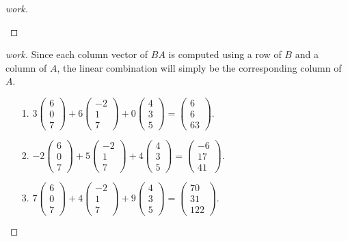 \documentclass{article}
\begin{document}
\begin{question}{1.3}{}
{\begin{enumerate}
\begin{proof}[work]
\begin{enumerate}
        \end{enumerate}
      \end{proof}
      \begin{proof}[work] Since each column vector of $BA$ is computed using a row of $B$ and a column of $A$, the linear combination will simply be the corresponding column of $A$.
        \begin{enumerate}
          \item[1.] $3\begin{pmatrix}6 \\ 0 \\ 7\end{pmatrix} + 6\begin{pmatrix}-2 \\ 1 \\ 7\end{pmatrix} + 0\begin{pmatrix}4 \\ 3 \\ 5\end{pmatrix} = \begin{pmatrix}6 \\ 6 \\ 63\end{pmatrix}$.
          \item[2.] $-2\begin{pmatrix}6 \\ 0 \\ 7\end{pmatrix} + 5\begin{pmatrix}-2 \\ 1 \\ 7\end{pmatrix} + 4\begin{pmatrix}4 \\ 3 \\ 5\end{pmatrix} = \begin{pmatrix}-6 \\ 17 \\ 41\end{pmatrix}$.
          \item[3.] $7\begin{pmatrix}6 \\ 0 \\ 7\end{pmatrix} + 4\begin{pmatrix}-2 \\ 1 \\ 7\end{pmatrix} + 9\begin{pmatrix}4 \\ 3 \\ 5\end{pmatrix} = \begin{pmatrix}70 \\ 31 \\ 122\end{pmatrix}$.

\end{enumerate}
\end{proof}
\end{enumerate}}
\end{question}
\end{document}
